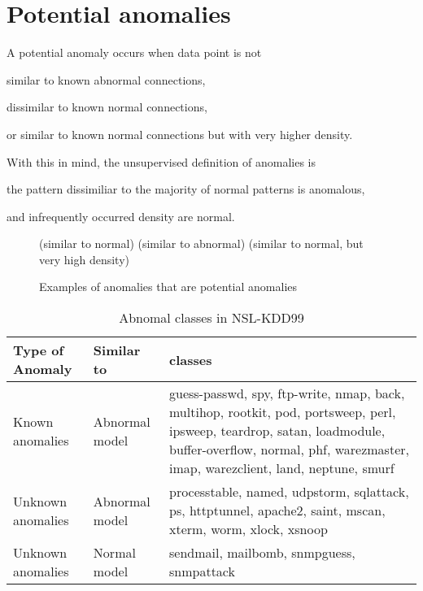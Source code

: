 \section{Potential anomalies}
A potential anomaly occurs when data point is not \begin{inparaenum}
\item similar to known abnormal connections,
\item dissimilar to known normal connections,
\item or similar to known normal connections but with very higher density.
\end{inparaenum}

With this in mind, the unsupervised definition of anomalies is \begin{inparaenum}
\item the pattern dissimiliar to the majority of normal patterns is anomalous, 
\item and infrequently occurred density are normal.
\end{inparaenum}

\begin{figure}[htb2]
\begin{center}
(similar to normal)
(similar to abnormal)
(similar to normal, but very high density)
\end{center}
\caption{Examples of anomalies that are potential anomalies}
\label{fig:refSingleRobot1}
\end{figure}

\begin{table}[h]
\begin{center}
\begin{tabular}{| l | l | p{5cm} |}
\hline
Type of Anomaly & Similar to & classes \\
\hline
Known anomalies & Abnormal model & guess-passwd, spy, ftp-write, nmap, back, multihop, rootkit, pod, portsweep, perl, ipsweep, teardrop, satan, loadmodule, buffer-overflow, normal, phf, warezmaster, imap, warezclient, land, neptune, smurf \\
\hline
Unknown anomalies & Abnormal model & processtable, named, udpstorm, sqlattack, ps, httptunnel, apache2, saint, mscan, xterm, worm, xlock, xsnoop \\
\hline
Unknown anomalies & Normal model & sendmail, mailbomb, snmpguess, snmpattack \\
\hline
\end{tabular}
\end{center}
\caption{Abnomal classes in NSL-KDD99}
\label{fig:refSingleRobot1}
\end{table}



